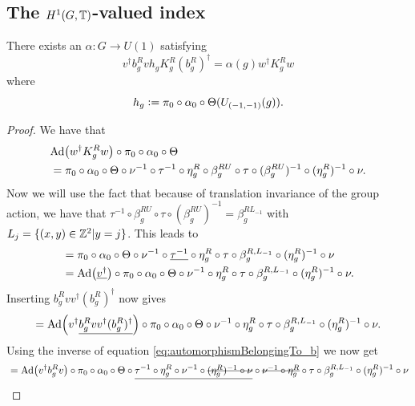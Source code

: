 \documentclass[11pt,a4paper,twoside]{article}
\numberwithin{equation}{section}
\begin{document}
	\subsection{The $H^1(G,\mathbb T)$-valued index}\label{sec:DefinitionH1Index}
	
	\begin{lemma}\label{lem:DefinitionAlpha}
		There exists an $\alpha:G\rightarrow U(1)$ satisfying
		\begin{equation}\label{eq:DefinitionOfTheH_1Index}
			v^\dagger b_g^R vh_g K_g^R (b_g^R)^\dagger=\alpha(g)w^\dagger K_g^R w
		\end{equation}
		where
		\begin{equation}
			h_g\vcentcolon=\pi_0\circ\alpha_0\circ\Theta(U_{(-1,-1)}(g)).
		\end{equation}
	\end{lemma}
	\begin{proof}
		We have that
		\begin{align}
			&\Ad{w^\dagger K_g^R w}\circ\pi_0\circ\alpha_0\circ\Theta\\
			&=\pi_0\circ\alpha_0\circ\Theta\circ\nu^{-1}\circ\tau^{-1}\circ\eta_g^R\circ\beta_g^{RU}\circ\tau\circ(\beta_g^{RU})^{-1}\circ(\eta_g^R)^{-1}\circ\nu.
		\end{align}
		Now we will use the fact that because of translation invariance of the group action, we have that $\tau^{-1}\circ\beta_g^{RU}\circ\tau\circ(\beta_g^{RU})^{-1}=\beta_g^{RL_{-1}}$ with $L_j=\{(x,y)\in\mathbb Z^2|y=j\}$. This leads to
		\begin{align}
			&=\pi_0\circ\alpha_0\circ\Theta\circ\nu^{-1}\circ\underline{\tau^{-1}}\circ\eta_g^R\circ\tau\circ\beta_g^{R,L_{-1}}\circ(\eta_g^R)^{-1}\circ\nu\\
			&=\Ad{\underline{v^\dagger}}\circ \pi_0\circ\alpha_0\circ\Theta\circ\nu^{-1}\circ\eta_g^R\circ\tau\circ\beta_g^{R,L_{-1}}\circ(\eta_g^R)^{-1}\circ\nu.
		\end{align}
		Inserting $b^R_g v v^\dagger (b^R_g)^\dagger$ now gives
		\begin{equation}
			=\Ad{v^\dagger\underline{b^R_g v v^\dagger (b^R_g)^\dagger}}\circ \pi_0\circ\alpha_0\circ\Theta\circ\nu^{-1}\circ\eta_g^R\circ\tau\circ\beta_g^{R,L_{-1}}\circ(\eta_g^R)^{-1}\circ\nu.
		\end{equation}
		Using the inverse of equation \eqref{eq:automorphismBelongingTo_b} we now get
		\begin{align}
			&=\Ad{v^\dagger b^R_g v }\circ \pi_0\circ\alpha_0\circ\Theta\circ\underline{\tau^{-1}\circ\eta_g^R\circ\nu^{-1}\circ\stkout{(\eta_g^R)^{-1}\circ\nu}}\circ\stkout{\nu^{-1}\circ\eta_g^R}\circ\tau\circ\beta_g^{R,L_{-1}}\circ(\eta_g^R)^{-1}\circ\nu\\

\end{align}
\end{proof}
\end{document}
